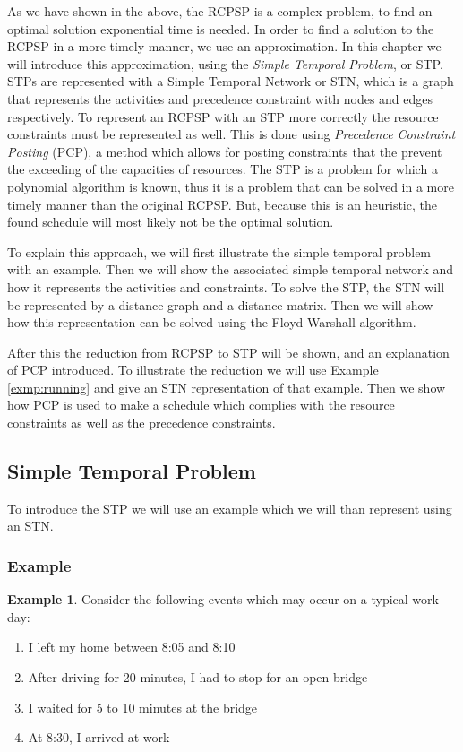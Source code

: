 \documentclass{article}
\theoremstyle{definition}
\newtheorem{example}{Example}[section]
\begin{document}
As we have shown in the above, the RCPSP is a complex problem, to find an optimal solution exponential time is needed.
In order to find a solution to the RCPSP in a more timely manner, we use an approximation.
In this chapter we will introduce this approximation, using the \emph{Simple Temporal Problem}, or STP.
STPs are represented with a Simple Temporal Network or STN, which is a graph that represents the activities and precedence constraint with nodes and edges respectively.
To represent an RCPSP with an STP more correctly the resource constraints must be represented as well. 
This is done using \emph{Precedence Constraint Posting} (PCP), a method which allows for posting constraints that the prevent the exceeding of the capacities of resources.
The STP is a problem for which a polynomial algorithm is known, thus it is a problem that can be solved in a more timely manner than the original RCPSP.
But, because this is an heuristic, the found schedule will most likely not be the optimal solution.

To explain this approach, we will first illustrate the simple temporal problem with an example.
Then we will show the associated simple temporal network and how it represents the activities and constraints.
To solve the STP, the STN will be represented by a distance graph and a distance matrix.
Then we will show how this representation can be solved using the Floyd-Warshall algorithm.

After this the reduction from RCPSP to STP will be shown, and an explanation of PCP introduced.
To illustrate the reduction we will use Example \ref{exmp:running} and give an STN representation of that example.
Then we show how PCP is used to make a schedule which complies with the resource constraints as well as the precedence constraints.

\subsection{Simple Temporal Problem}
\label{text:STN}
To introduce the STP we will use an example which we will than represent using an STN.

\subsubsection{Example}
\begin{example}
\label{exmp:stn}
Consider the following events which may occur on a typical work day:
\begin{enumerate}
\item I left my home between 8:05 and 8:10
\item After driving for 20 minutes, I had to stop for an open bridge
\item I waited for 5 to 10 minutes at the bridge
\item At 8:30, I arrived at work 
\end{enumerate}
\end{example}
\end{document}
